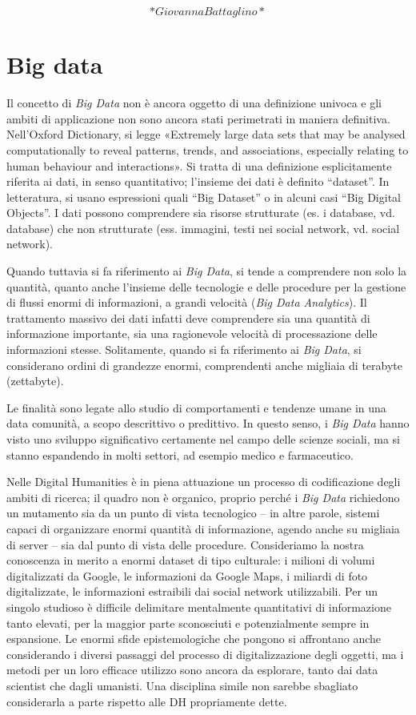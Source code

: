 \documentclass[
  b5paper,
  twoside,
  11pt,
  chapterprefix=false,
  bibliography=totocnumbered,
  parskip=0]{scrbook}
\begin{document}
\[*Giovanna Battaglino*\]

\hypertarget{big-data}{%
\chapter{Big data}\label{big-data}}

Il concetto di \emph{Big Data} non è ancora oggetto di una definizione
univoca e gli ambiti di applicazione non sono ancora stati perimetrati
in maniera definitiva. Nell'Oxford Dictionary, si legge «Extremely large
data sets that may be analysed computationally to reveal patterns,
trends, and associations, especially relating to human behaviour and
interactions». Si tratta di una definizione esplicitamente riferita ai
dati, in senso quantitativo; l'insieme dei dati è definito \enquote{dataset}. In
letteratura, si usano espressioni quali \enquote{Big Dataset} o in alcuni casi
\enquote{Big Digital Objects}. I dati possono comprendere sia risorse
strutturate (es. i database, vd. database) che non strutturate (ess.
immagini, testi nei social network, vd. social network).

Quando tuttavia si fa riferimento ai \emph{Big Data}, si tende a comprendere
non solo la quantità, quanto anche l'insieme delle tecnologie e delle
procedure per la gestione di flussi enormi di informazioni, a grandi
velocità (\emph{Big Data Analytics}). Il trattamento massivo dei dati infatti
deve comprendere sia una quantità di informazione importante, sia una
ragionevole velocità di processazione delle informazioni stesse.
Solitamente, quando si fa riferimento ai \emph{Big Data}, si considerano
ordini di grandezze enormi, comprendenti anche migliaia di terabyte
(zettabyte).

Le finalità sono legate allo studio di comportamenti e tendenze umane in
una data comunità, a scopo descrittivo o predittivo. In questo senso, i
\emph{Big Data} hanno visto uno sviluppo significativo certamente nel campo
delle scienze sociali, ma si stanno espandendo in molti settori, ad
esempio medico e farmaceutico.

Nelle Digital Humanities è in piena attuazione un processo di
codificazione degli ambiti di ricerca; il quadro non è organico, proprio
perché i \emph{Big Data} richiedono un mutamento sia da un punto di vista
tecnologico -- in altre parole, sistemi capaci di organizzare enormi
quantità di informazione, agendo anche su migliaia di server -- sia dal
punto di vista delle procedure. Consideriamo la nostra conoscenza in
merito a enormi dataset di tipo culturale: i milioni di volumi
digitalizzati da Google, le informazioni da Google Maps, i miliardi di
foto digitalizzate, le informazioni estraibili dai social network
utilizzabili. Per un singolo studioso è difficile delimitare mentalmente
quantitativi di informazione tanto elevati, per la maggior parte
sconosciuti e potenzialmente sempre in espansione. Le enormi sfide
epistemologiche che pongono si affrontano anche considerando i diversi
passaggi del processo di digitalizzazione degli oggetti, ma i metodi per
un loro efficace utilizzo sono ancora da esplorare, tanto dai data
scientist che dagli umanisti. Una disciplina simile non sarebbe
sbagliato considerarla a parte rispetto alle DH propriamente dette.
\end{document}
